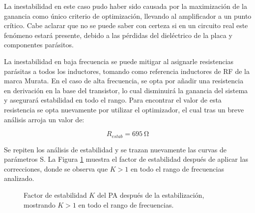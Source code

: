 La inestabilidad en este caso pudo haber sido causada por la maximización de la ganancia como único criterio de optimización, llevando al amplificador a un punto crítico. Cabe aclarar que no se puede saber con certeza si en un circuito real este fenómeno estará presente, debido a las pérdidas del dieléctrico de la placa y componentes parásitos.

La inestabilidad en baja frecuencia se puede mitigar al asignarle resistencias parásitas a todos los inductores, tomando como referencia inductores de RF de la marca Murata. En el caso de alta frecuencia, se opta por añadir una resistencia en derivación en la base del transistor, lo cual disminuirá la ganancia del sistema y asegurará estabilidad en todo el rango. Para encontrar el valor de esta resistencia se opta nuevamente por utilizar el optimizador, el cual tras un breve análisis arroja un valor de:

\begin{equation}
\boxed{R_{estab} = \qty{695}{\ohm}}
\end{equation}

Se repiten los análisis de estabilidad y se trazan nuevamente las curvas de parámetros S. La Figura \ref{fig:pa_stab_fact_stab} muestra el factor de estabilidad después de aplicar las correcciones, donde se observa que $K > 1$ en todo el rango de frecuencias analizado.

\begin{figure}[htbp]
\centering
{}
\captionsetup{justification=centering}
\caption{Factor de estabilidad $K$ del PA después de la estabilización, \\ mostrando $K > 1$ en todo el rango de frecuencias.}
\label{fig:pa_stab_fact_stab}
\end{figure}

